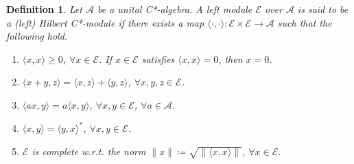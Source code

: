 \documentclass{amsart}
\newtheorem{definition}[theorem]{Definition}
\begin{document}
\begin{definition}\cite{KAPLANSKY, PASCHKE, RIEFFEL}
	Let $\mathcal{A}$ be a  unital C*-algebra. A left module 	 $\mathcal{E}$  over $\mathcal{A}$ is said to be a (left) Hilbert C*-module if there exists a  map $ \langle \cdot, \cdot \rangle: \mathcal{E}\times \mathcal{E} \to \mathcal{A}$ such that the following hold. 
	\begin{enumerate}[\upshape(i)]
		\item $\langle x, x \rangle  \geq 0$, $\forall x \in \mathcal{E}$. If $x \in  \mathcal{E}$ satisfies $\langle x, x \rangle  =0 $, then $x=0$.
		\item $\langle x+y, z \rangle  =\langle x, z \rangle+\langle y, z \rangle$, $\forall x,y,z \in \mathcal{E}$.
		\item  $\langle ax, y \rangle  =a\langle x, y \rangle$, $\forall x,y \in \mathcal{E}$, $\forall a \in \mathcal{A}$.
		\item $\langle x, y \rangle=\langle y,x \rangle^*$, $\forall x,y \in \mathcal{E}$.
		\item $\mathcal{E}$ is complete w.r.t. the norm $\|x\|\coloneqq \sqrt{\|\langle x, x \rangle\|}$,  $\forall x \in \mathcal{E}$.
	\end{enumerate}
\end{definition}
\end{document}
